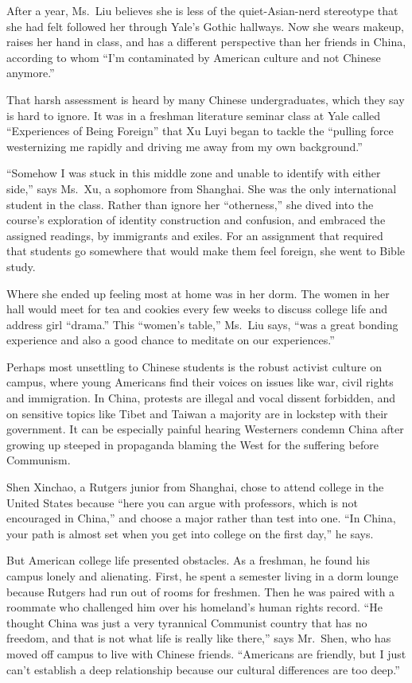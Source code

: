 ﻿\documentclass[12pt]{article}
\begin{document}
After a year, Ms.~Liu believes she is less of the quiet-Asian-nerd stereotype that she had felt
followed her through Yale's Gothic hallways. Now she wears makeup, raises her hand in class, and has
a different perspective than her friends in China, according to whom ``I'm contaminated by American
culture and not Chinese anymore.''

That harsh assessment is heard by many Chinese undergraduates, which they say is hard to ignore. It
was in a freshman literature seminar class at Yale called ``Experiences of Being Foreign'' that Xu
Luyi began to tackle the ``pulling force westernizing me rapidly and driving me away from my own
background.''

``Somehow I was stuck in this middle zone and unable to identify with either side,'' says Ms.~Xu, a
sophomore from Shanghai. She was the only international student in the class. Rather than ignore her
``otherness,'' she dived into the course's exploration of identity construction and confusion, and
embraced the assigned readings, by immigrants and exiles. For an assignment that required that
students go somewhere that would make them feel foreign, she went to Bible study.

Where she ended up feeling most at home was in her dorm. The women in her hall would meet for tea
and cookies every few weeks to discuss college life and address girl ``drama.'' This ``women's
table,'' Ms.~Liu says, ``was a great bonding experience and also a good chance to meditate on our
experiences.''

Perhaps most unsettling to Chinese students is the robust activist culture on campus, where young
Americans find their voices on issues like war, civil rights and immigration. In China, protests are
illegal and vocal dissent forbidden, and on sensitive topics like Tibet and Taiwan a majority are in
lockstep with their government. It can be especially painful hearing Westerners condemn China after
growing up steeped in propaganda blaming the West for the suffering before Communism.

Shen Xinchao, a Rutgers junior from Shanghai, chose to attend college in the United States because
``here you can argue with professors, which is not encouraged in China,'' and choose a major rather
than test into one. ``In China, your path is almost set when you get into college on the first
day,'' he says.

But American college life presented obstacles. As a freshman, he found his campus lonely and
alienating. First, he spent a semester living in a dorm lounge because Rutgers had run out of rooms
for freshmen. Then he was paired with a roommate who challenged him over his homeland's human rights
record. ``He thought China was just a very tyrannical Communist country that has no freedom, and
that is not what life is really like there,'' says Mr.~Shen, who has moved off campus to live with
Chinese friends. ``Americans are friendly, but I just can't establish a deep relationship because
our cultural differences are too deep.''
\end{document}
